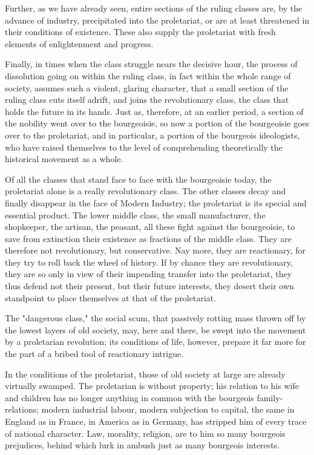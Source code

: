 \documentclass[, oneside]{article}   	%
\begin{document}
Further, as we have already seen, entire sections of the ruling classes are, by the advance of industry, precipitated into the proletariat, or are at least threatened in their conditions of existence. These also supply the proletariat with fresh elements of enlightenment and progress.

Finally, in times when the class struggle nears the decisive hour, the process of dissolution going on within the ruling class, in fact within the whole range of society, assumes such a violent, glaring character, that a small section of the ruling class cuts itself adrift, and joins the revolutionary class, the class that holds the future in its hands. Just as, therefore, at an earlier period, a section of the nobility went over to the bourgeoisie, so now a portion of the bourgeoisie goes over to the proletariat, and in particular, a portion of the bourgeois ideologists, who have raised themselves to the level of comprehending theoretically the historical movement as a whole.

Of all the classes that stand face to face with the bourgeoisie today, the proletariat alone is a really revolutionary class. The other classes decay and finally disappear in the face of Modern Industry; the proletariat is its special and essential product. The lower middle class, the small manufacturer, the shopkeeper, the artisan, the peasant, all these fight against the bourgeoisie, to save from extinction their existence as fractions of the middle class. They are therefore not revolutionary, but conservative. Nay more, they are reactionary, for they try to roll back the wheel of history. If by chance they are revolutionary, they are so only in view of their impending transfer into the proletariat, they thus defend not their present, but their future interests, they desert their own standpoint to place themselves at that of the proletariat.

The "dangerous class," the social scum, that passively rotting mass thrown off by the lowest layers of old society, may, here and there, be swept into the movement by a proletarian revolution; its conditions of life, however, prepare it far more for the part of a bribed tool of reactionary intrigue.

In the conditions of the proletariat, those of old society at large are already virtually swamped. The proletarian is without property; his relation to his wife and children has no longer anything in common with the bourgeois family-relations; modern industrial labour, modern subjection to capital, the same in England as in France, in America as in Germany, has stripped him of every trace of national character. Law, morality, religion, are to him so many bourgeois prejudices, behind which lurk in ambush just as many bourgeois interests.
\end{document}

